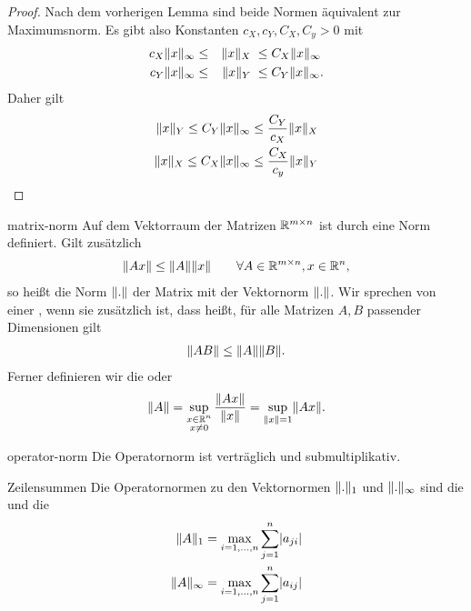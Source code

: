 \begin{proof}
  Nach dem vorherigen Lemma sind beide Normen äquivalent zur Maximumsnorm. Es gibt also Konstanten $c_X, c_Y, C_X, C_y>0$ mit
  \begin{gather}
    \begin{aligned}
     c_X \lVert x\rVert_\infty &\le &\lVert x\rVert_X \;&\le C_X \lVert x\rVert_\infty\\
     c_Y \lVert x\rVert_\infty &\le &\lVert x\rVert_Y \;&\le C_Y \lVert x\rVert_\infty.
    \end{aligned}
  \end{gather}
  Daher gilt
  \begin{gather}
    \begin{split}
      \lVert x\rVert_Y \le C_Y\lVert x\rVert_\infty &\le \frac{C_Y}{c_X} \lVert x\rVert_X\\
      \lVert x\rVert_X \le C_X\lVert x\rVert_\infty &\le \frac{C_X}{c_y} \lVert x\rVert_Y
    \end{split}
  \end{gather}
\end{proof}

\begin{Definition}{matrix-norm}
  Auf dem Vektorraum der Matrizen $\mathbb R^{m\times n}$ ist durch
   eine Norm definiert. Gilt zusätzlich
  \begin{gather}
    \lVert Ax\rVert \le \lVert A\rVert\lVert x\rVert
    \qquad\forall A\in \mathbb R^{m\times n}, x\in \mathbb R^n,
  \end{gather}
  so heißt die Norm $\lVert.\rVert$ der Matrix  mit der
  Vektornorm $\lVert.\rVert$. Wir sprechen von einer ,
  wenn sie zusätzlich  ist, dass heißt,
  für alle Matrizen $A,B$ passender Dimensionen gilt
  \begin{gather}
    \lVert AB\rVert \le \lVert A\rVert\lVert B\rVert.
  \end{gather}
  Ferner definieren wir die  oder 
  \begin{gather}
    \lVert A\rVert = \sup_{\substack{x\in\mathbb R^n\\x\neq0}} \frac{\lVert Ax\rVert}{\lVert x\rVert}
    = \sup_{\lVert x\rVert=1}\lVert Ax\rVert.
  \end{gather}
\end{Definition}

\begin{Lemma}{operator-norm}
  Die Operatornorm ist verträglich und submultiplikativ.
\end{Lemma}

\begin{Beispiel}{Zeilensummen}
  Die Operatornormen zu den Vektornormen $\lVert.\rVert_1$ und
  $\lVert.\rVert_\infty$ sind die  und die
  \begin{align}
    \lVert A\rVert_1 &= \max_{i=1,\dots,n} \sum_{j=1}^n \lvert a_{ji}\rvert\\
    \lVert A\rVert_\infty &= \max_{i=1,\dots,n} \sum_{j=1}^n \lvert a_{ij}\rvert
  \end{align}
\end{Beispiel}

